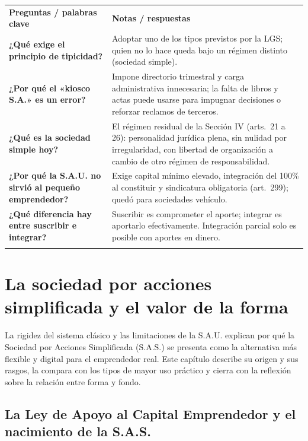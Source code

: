 \documentclass[12pt,oneside]{book}
\newcommand{\cq}[1]{\textbf{#1}}
\newcommand{\cornell}[3]{%
  \par\medskip\noindent\begingroup
  \renewcommand{\arraystretch}{1.25}%
  \begin{tabularx}{\textwidth}{|>{\raggedright\arraybackslash}p{0.27\textwidth}|>{\raggedright\arraybackslash}X|}
    \hline
    \multicolumn{2}{|>{\centering\arraybackslash}X|}{\cellcolor{azulacad!12}\textbf{Cuadro Cornell --- #1}}\\ \hline
    \cellcolor{gray!10}\textbf{Preguntas / palabras clave} & \cellcolor{gray!10}\textbf{Notas / respuestas} \\ \hline
    #2
    \multicolumn{2}{|>{\raggedright\arraybackslash}X|}{\cellcolor{azulacad!6}\textbf{Resumen.} #3}\\ \hline
  \end{tabularx}%
  \endgroup\par\medskip}
\begin{document}
\cornell{Tipos societarios y crisis de la tipicidad}{
\cq{¿Qué exige el principio de tipicidad?} & Adoptar uno de los tipos previstos por la LGS; quien no lo hace queda bajo un régimen distinto (sociedad simple). \\ \hline
\cq{¿Por qué el «kiosco S.A.» es un error?} & Impone directorio trimestral y carga administrativa innecesaria; la falta de libros y actas puede usarse para impugnar decisiones o reforzar reclamos de terceros. \\ \hline
\cq{¿Qué es la sociedad simple hoy?} & El régimen residual de la Sección IV (arts.~21 a 26): personalidad jurídica plena, sin nulidad por irregularidad, con libertad de organización a cambio de otro régimen de responsabilidad. \\ \hline
\cq{¿Por qué la S.A.U. no sirvió al pequeño emprendedor?} & Exige capital mínimo elevado, integración del 100\% al constituir y sindicatura obligatoria (art.~299); quedó para sociedades vehículo. \\ \hline
\cq{¿Qué diferencia hay entre suscribir e integrar?} & Suscribir es comprometer el aporte; integrar es aportarlo efectivamente. Integración parcial solo es posible con aportes en dinero. \\ \hline
}{El sistema de tipicidad obliga a elegir un tipo, pero el tipo más prestigioso no siempre es el adecuado. La sociedad simple y la S.A.U. fueron dos respuestas a esa rigidez; la primera flexibiliza a cambio de otra responsabilidad y la segunda, pese a su objetivo original, quedó reservada a grandes estructuras.}

\chapter{La sociedad por acciones simplificada y el valor de la forma}
\label{cap:sas}

La rigidez del sistema clásico y las limitaciones de la S.A.U. explican por qué la Sociedad por Acciones Simplificada (S.A.S.) se presenta como la alternativa más flexible y digital para el emprendedor real. Este capítulo describe su origen y sus rasgos, la compara con los tipos de mayor uso práctico y cierra con la reflexión sobre la relación entre forma y fondo.

\section{La Ley de Apoyo al Capital Emprendedor y el nacimiento de la S.A.S.}
\end{document}
